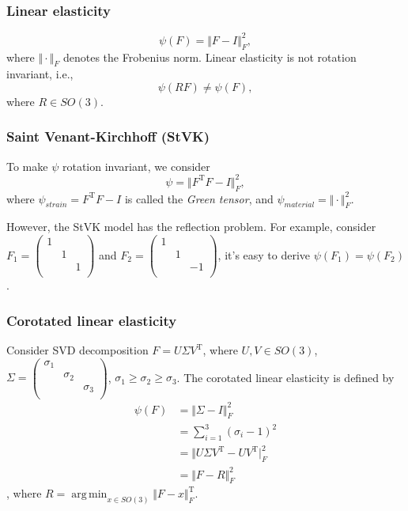 \documentclass{fancydoc}
\newcommand{\trans}{\mathrm{T}}
\DeclareMathOperator*{\argmin}{arg\,min}
\begin{document}
\subsubsection{Linear elasticity}\label{sec:psi_linear}
\begin{equation}
\psi (F) = \Vert F - I \Vert^2_F,
\end{equation}
where $\Vert \cdot \Vert_F$ denotes the Frobenius norm. Linear elasticity is not rotation invariant, i.e.,
\begin{equation}
\psi(RF) \neq \psi(F),
\end{equation}
where $R \in SO(3)$.

\subsubsection{Saint Venant-Kirchhoff (StVK)}\label{sec:psi_stvk}
To make $\psi$ rotation invariant, we consider
\begin{equation}
\psi = \Vert F^\trans F - I \Vert^2_F,
\end{equation}
where $\psi_{strain} = F^\trans F - I$ is called the \textit{Green tensor}, and $\psi_{material} = \Vert \cdot \Vert^2_F$.

However, the StVK model has the reflection problem. For example, consider $F_1 = \begin{pmatrix}
1 & & \\
 & 1 & \\
 & & 1 \\
\end{pmatrix}$ and $F_2 = \begin{pmatrix}
1 & & \\
& 1 & \\
& & -1\\
\end{pmatrix}$,
 it's easy to derive $\psi(F_1) = \psi(F_2)$.
 
\subsubsection{Corotated linear elasticity}\label{sec:psi_corot}
Consider SVD decomposition $F = U \Sigma V^\trans$, where $U, V \in SO(3)$, $\Sigma = \begin{pmatrix}
\sigma_1 & & \\
& \sigma_2 & \\
& & \sigma_3 \\
\end{pmatrix}$, $\sigma_1 \geq \sigma_2 \geq \sigma_3$.
The corotated linear elasticity is defined by
\begin{subequations}
	\begin{align}
	\psi(F) &= \Vert \Sigma - I \Vert^2_F \\
	        &= \sum^3_{i=1}(\sigma_i - 1)^2 \\
	        &= \Vert U\Sigma V^\trans - UV^\trans \vert^2_F \\
	        &= \Vert F - R \Vert^2_F
	\end{align}
\end{subequations},
where $R = \argmin_{x \in SO(3)} \Vert F - x \Vert^\trans_F$.
\end{document}
